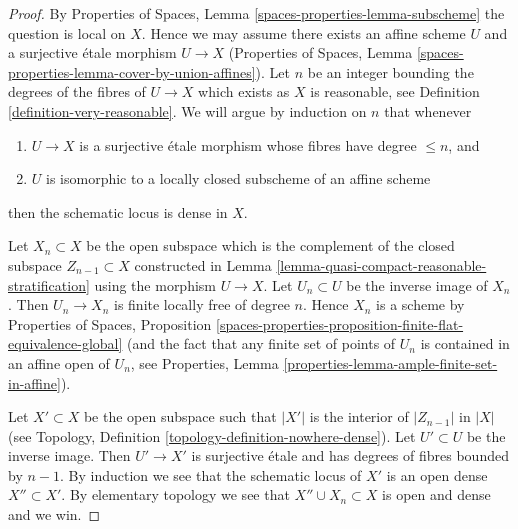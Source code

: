 \documentclass{stacks-project}
\theoremstyle{plain}
\theoremstyle{definition}
\theoremstyle{remark}
\numberwithin{equation}{subsection}
\begin{document}
\begin{proof}
By Properties of Spaces,
Lemma \ref{spaces-properties-lemma-subscheme}
the question is local on $X$. Hence we may assume there exists an affine
scheme $U$ and a surjective \'etale morphism $U \to X$
(Properties of Spaces, Lemma
\ref{spaces-properties-lemma-cover-by-union-affines}).
Let $n$ be an integer bounding the degrees of the fibres of $U \to X$
which exists as $X$ is reasonable, see
Definition \ref{definition-very-reasonable}.
We will argue by induction on $n$ that whenever
\begin{enumerate}
\item $U \to X$ is a surjective \'etale morphism whose fibres have
degree $\leq n$, and
\item $U$ is isomorphic to a locally closed subscheme of an affine scheme
\end{enumerate}
then the schematic locus is dense in $X$.

\medskip\noindent
Let $X_n \subset X$ be the open subspace which is the complement of the
closed subspace $Z_{n - 1} \subset X$ constructed in
Lemma \ref{lemma-quasi-compact-reasonable-stratification}
using the morphism $U \to X$.
Let $U_n \subset U$ be the inverse image of $X_n$. Then
$U_n \to X_n$ is finite locally free of degree $n$.
Hence $X_n$ is a scheme by
Properties of Spaces, Proposition
\ref{spaces-properties-proposition-finite-flat-equivalence-global}
(and the fact that any finite set of points of $U_n$ is contained in
an affine open of $U_n$, see
Properties, Lemma \ref{properties-lemma-ample-finite-set-in-affine}).

\medskip\noindent
Let $X' \subset X$ be the open subspace such that $|X'|$ is the
interior of $|Z_{n - 1}|$ in $|X|$ (see
Topology, Definition \ref{topology-definition-nowhere-dense}).
Let $U' \subset U$ be the inverse image. Then $U' \to X'$ is surjective
\'etale and has degrees of fibres bounded by $n - 1$. By induction
we see that the schematic locus of $X'$ is an open dense $X'' \subset X'$.
By elementary topology we see that $X'' \cup X_n \subset X$ is
open and dense and we win.
\end{proof}
\end{document}
